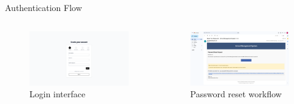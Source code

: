 \documentclass[aspectratio=169]{beamer}
\begin{document}
\begin{frame}{Authentication Flow}
    \begin{columns}
        \begin{figure}
            \includegraphics[width=\textwidth,height=0.6\textheight,keepaspectratio]{../pfe-pics/auth/Screenshot 2025-06-09 at 23-00-18 Vite React TS.png}
            \caption{Login interface}
        \end{figure}
        \begin{figure}
            \includegraphics[width=\textwidth,height=0.6\textheight,keepaspectratio]{../pfe-pics/auth/Screenshot 2025-06-09 at 23-08-41 Reset Your Password - School Management System - vertigoevilman1@gmail.com - Gmail.png}
            \caption{Password reset workflow}
        \end{figure}
    \end{columns}
\end{frame}
\end{document}
